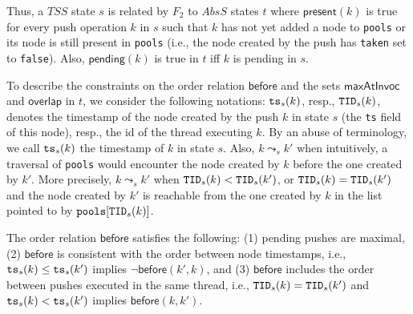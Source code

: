 Thus, a $\mathit{TSS}$ state $s$ is related by $F_2$ to $AbsS$ states $t$ where $\mathsf{present}(k)$ is true for every push operation $k$ in $s$ such that $k$ has not yet added a node to {\tt pools} or its node is still present in {\tt pools} (i.e., the node created by the push has {\tt taken} set to {\tt false}). Also, $\mathsf{pending}(k)$ is true in $t$ iff $k$ is pending in $s$. 

To describe the constraints on the order relation $\mathsf{before}$ and the sets $\mathsf{maxAtInvoc}$ and $\mathsf{overlap}$ in $t$, we consider the following notations: ${\tt ts}_s(k)$, resp., ${\tt TID}_s(k)$, denotes the timestamp of the node created by the push $k$ in state $s$ (the {\tt ts} field of this node), resp., the id of the thread executing $k$. By an abuse of terminology, we call ${\tt ts}_s(k)$ the timestamp of $k$ in state $s$.
Also, $k \leadsto_s k'$ when intuitively, a traversal of {\tt pools}  would encounter the node created by $k$ before the one created by $k'$. More precisely, $k \leadsto_s k'$ when ${\tt TID}_s(k) < {\tt TID}_s(k')$, or ${\tt TID}_s(k) = {\tt TID}_s(k')$ and the node created by $k'$ is reachable from the one created by $k$ in the list pointed to by ${\tt pools}[{\tt TID}_s(k)]$.

The order relation $\mathsf{before}$ satisfies the following: (1) pending pushes are maximal, (2) $\mathsf{before}$ is consistent with the order between node timestamps, i.e., ${\tt ts}_s(k) \leq {\tt ts}_s(k')$ implies $\neg \mathsf{before}(k',k)$, and (3) $\mathsf{before}$ includes the order between pushes executed in the same thread, i.e., ${\tt TID}_s(k) = {\tt TID}_s(k')$ and ${\tt ts}_s(k) < {\tt ts}_s(k')$ implies $\mathsf{before}(k, k')$.

